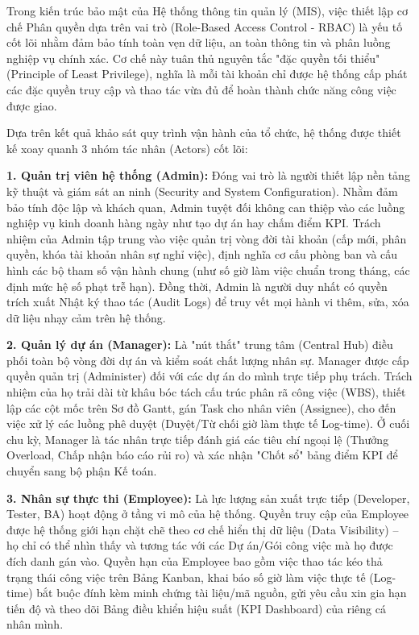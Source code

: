 \documentclass[a4paper,13.5pt]{extreport}
\begin{document}
Trong kiến trúc bảo mật của Hệ thống thông tin quản lý (MIS), việc thiết lập cơ chế Phân quyền dựa trên vai trò (Role-Based Access Control - RBAC) là yếu tố cốt lõi nhằm đảm bảo tính toàn vẹn dữ liệu, an toàn thông tin và phân luồng nghiệp vụ chính xác. Cơ chế này tuân thủ nguyên tắc "đặc quyền tối thiểu" (Principle of Least Privilege), nghĩa là mỗi tài khoản chỉ được hệ thống cấp phát các đặc quyền truy cập và thao tác vừa đủ để hoàn thành chức năng công việc được giao. 

Dựa trên kết quả khảo sát quy trình vận hành của tổ chức, hệ thống được thiết kế xoay quanh 3 nhóm tác nhân (Actors) cốt lõi:

\textbf{1. Quản trị viên hệ thống (Admin):} 
Đóng vai trò là người thiết lập nền tảng kỹ thuật và giám sát an ninh (Security and System Configuration). Nhằm đảm bảo tính độc lập và khách quan, Admin tuyệt đối không can thiệp vào các luồng nghiệp vụ kinh doanh hàng ngày như tạo dự án hay chấm điểm KPI. Trách nhiệm của Admin tập trung vào việc quản trị vòng đời tài khoản (cấp mới, phân quyền, khóa tài khoản nhân sự nghỉ việc), định nghĩa cơ cấu phòng ban và cấu hình các bộ tham số vận hành chung (như số giờ làm việc chuẩn trong tháng, các định mức hệ số phạt trễ hạn). Đồng thời, Admin là người duy nhất có quyền trích xuất Nhật ký thao tác (Audit Logs) để truy vết mọi hành vi thêm, sửa, xóa dữ liệu nhạy cảm trên hệ thống.

\textbf{2. Quản lý dự án (Manager):} 
Là "nút thắt" trung tâm (Central Hub) điều phối toàn bộ vòng đời dự án và kiểm soát chất lượng nhân sự. Manager được cấp quyền quản trị (Administer) đối với các dự án do mình trực tiếp phụ trách. Trách nhiệm của họ trải dài từ khâu bóc tách cấu trúc phân rã công việc (WBS), thiết lập các cột mốc trên Sơ đồ Gantt, gán Task cho nhân viên (Assignee), cho đến việc xử lý các luồng phê duyệt (Duyệt/Từ chối giờ làm thực tế Log-time). Ở cuối chu kỳ, Manager là tác nhân trực tiếp đánh giá các tiêu chí ngoại lệ (Thưởng Overload, Chấp nhận báo cáo rủi ro) và xác nhận "Chốt sổ" bảng điểm KPI để chuyển sang bộ phận Kế toán.

\textbf{3. Nhân sự thực thi (Employee):} 
Là lực lượng sản xuất trực tiếp (Developer, Tester, BA) hoạt động ở tầng vi mô của hệ thống. Quyền truy cập của Employee được hệ thống giới hạn chặt chẽ theo cơ chế hiển thị dữ liệu (Data Visibility) – họ chỉ có thể nhìn thấy và tương tác với các Dự án/Gói công việc mà họ được đích danh gán vào. Quyền hạn của Employee bao gồm việc thao tác kéo thả trạng thái công việc trên Bảng Kanban, khai báo số giờ làm việc thực tế (Log-time) bắt buộc đính kèm minh chứng tài liệu/mã nguồn, gửi yêu cầu xin gia hạn tiến độ và theo dõi Bảng điều khiển hiệu suất (KPI Dashboard) của riêng cá nhân mình.
\end{document}
